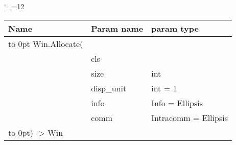 \begingroup \catcode`\_=12 \tt
\begin{tabular}{lll}
\toprule
\textrm{Name}&\textrm{Param name}&\textrm{param type}\\
\midrule
\hbox to 0pt {Win.Allocate(\hss}\\
& cls\\
& size & int\\
& disp_unit & int = 1\\
& info & Info = Ellipsis\\
& comm & Intracomm = Ellipsis\\
\hbox to 0pt{) -> Win\hss}\\
\bottomrule
\end{tabular}
\endgroup
